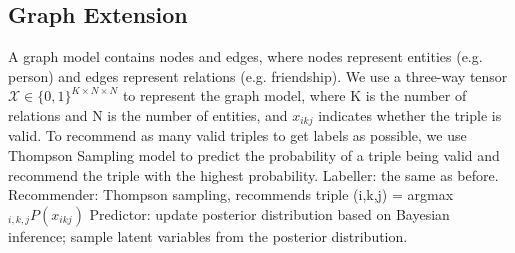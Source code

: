 \documentclass[11pt,twoside]{article}
\begin{document}
\subsection*{Graph Extension}

A graph model contains nodes and edges, where nodes represent entities (e.g. person) and edges represent relations (e.g. friendship). We use a three-way tensor $\mathcal{X} \in \{0,1\}^{K \times N \times N}$ to represent the graph model, where K is the number of relations and N is the number of entities, and $x_{ikj}$ indicates whether the triple is valid.\newline
To recommend as many valid triples to get labels as possible, we use Thompson Sampling model to predict the probability of a triple being valid and recommend the triple with the highest probability. \newline
\newline
Labeller: the same as before. \newline
Recommender: Thompson sampling, recommends triple (i,k,j) = {argmax}$_{i,k,j} P(x_{ikj})$ \newline
Predictor: update posterior distribution based on Bayesian inference; sample latent variables from the posterior distribution.
\end{document}
